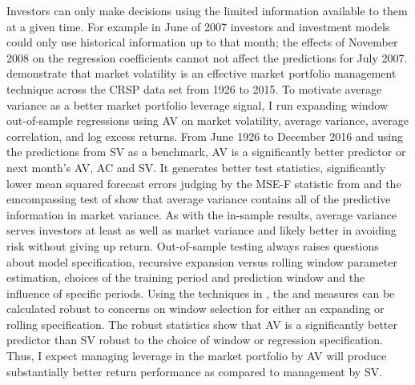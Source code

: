 Investors can only make decisions using the limited information available to them at a given time. For example in June of 2007 investors and investment models could only use historical information up to that month; the effects of November 2008 on the regression coefficients cannot not affect the predictions for July 2007. \citet{moreira_volatility-managed_2017} demonstrate that market volatility is an effective market portfolio management technique across the CRSP data set from 1926 to 2015. To motivate average variance as a better market portfolio leverage signal, I run expanding window out-of-sample regressions using AV on market volatility, average variance, average correlation, and log excess returns. From June 1926 to December 2016 and using the predictions from SV as a benchmark, AV is a significantly better predictor or next month’s AV, AC and SV. It generates better \citet{Diebold1995} test statistics, significantly lower mean squared forecast errors judging by the MSE-F statistic from \citet{mccracken_asymptotics_2007} and the emcompassing test of \citet{harvey_tests_1998} show that average variance contains all of the predictive information in market variance. As with the in-sample results, average variance serves investors at least as well as market variance and likely better in avoiding risk without giving up return. Out-of-sample testing always raises questions about model specification, recursive expansion versus rolling window parameter estimation, choices of the training period and prediction window and the influence of specific periods. Using the techniques in \citet{rossi_out--sample_2012}, the \citet{Diebold1995} and \citet{harvey_tests_1998} measures can be calculated robust to concerns on window selection for either an expanding or rolling specification.
The \citet{rossi_out--sample_2012}  robust statistics show that AV is a significantly better predictor than SV robust to the choice of window or regression specification. Thus, I expect managing leverage in the market portfolio by AV will produce substantially better return performance as compared to management by SV.

